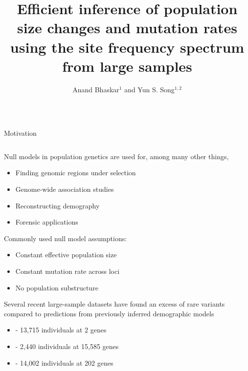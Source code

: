 \documentclass[final,hyperref={pdfpagelabels=false},professionalfonts,mathserif]{beamer}
\title{Efficient inference of population size changes and mutation rates\\ using the site frequency spectrum from large samples}
\author{Anand Bhaskar${}^1$ and Yun S. Song${}^{1,2}$}
\institute{${}^{1}$Computer Science Division and ${}^{2}$Department of Statistics, University of California, Berkeley}
\begin{document}
\begin{frame}[fragile]
\vspace{-1cm}
\begin{columns}[t]
	\begin{column}{.495\linewidth}
		\begin{block}{\large Motivation}\justifying 
			\begin{columns}[T]
			\begin{column}{.97\linewidth}
                \vspace{-0.5cm}
				Null models in population genetics are used for, among many other things,
				\begin{itemize}
					\item Finding genomic regions under selection
					\item Genome-wide association studies
					\item Reconstructing demography
					\item Forensic applications
				\end{itemize}				
				Commonly used null model assumptions:
				\begin{itemize}
					\item Constant effective population size
					\item Constant mutation rate across loci
					\item No population substructure
				\end{itemize}
				Several recent large-sample datasets have found an excess of rare variants
				compared to predictions from previously inferred demographic models
				\begin{itemize}
					\item \citet{coventry:2010} - 13,715 individuals at 2 genes
					\item \citet{tennessen:2012} - 2,440 individuals at 15,585 genes 
					\item \citet{nelson:2012} - 14,002 individuals at 202 genes
				\end{itemize}		
				\vspace{5pt}
				\centerline{
}
\end{column}
\end{columns}
\end{block}
\end{column}
\end{columns}
\end{frame}
\end{document}
